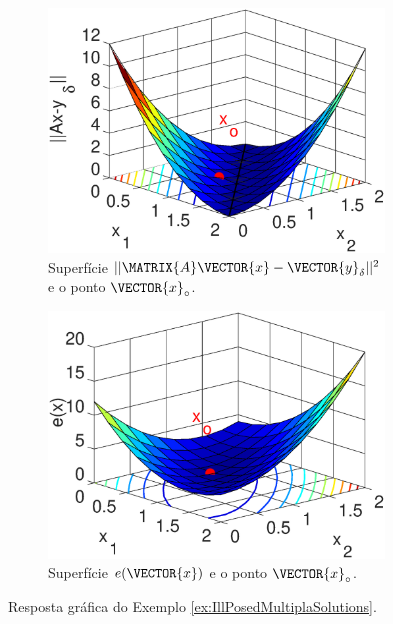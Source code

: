 \begin{figure}[h!]
     \centering
     \begin{subfigure}[b]{0.475\textwidth}
         \centering
         \includegraphics[width=0.98\textwidth]{chapters/notacao/mfiles/illpossed2/surfcaxyd.eps}
         \caption{Superfície $||\MATRIX{A}\VECTOR{x}-\VECTOR{y}_{\delta}||^2$ e o ponto $\VECTOR{x}_{\circ}$.}
         \label{fig:ex:IllPosedMultiplaSolutions:a}
     \end{subfigure}
     \hfill
     \begin{subfigure}[b]{0.475\textwidth}
         \centering
         \includegraphics[width=0.98\textwidth]{chapters/notacao/mfiles/illpossed2/surfcex.eps}
         \caption{Superfície $e(\VECTOR{x})$ e o ponto $\VECTOR{x}_{\circ}$. }
         \label{fig:ex:IllPosedMultiplaSolutions:b}
     \end{subfigure}
        \caption{Resposta gráfica do Exemplo \ref{ex:IllPosedMultiplaSolutions}. }
        \label{fig:ex:IllPosedMultiplaSolutions}
\end{figure}

